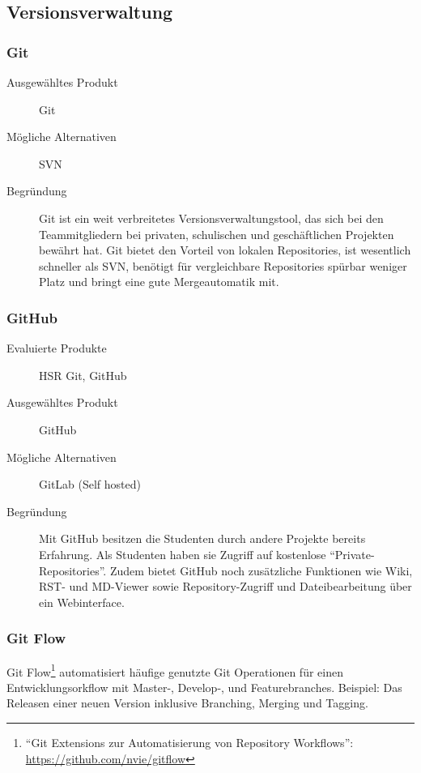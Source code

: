 		\subsection*{Versionsverwaltung}
			\subsubsection*{Git}
				\begin{description}
					\item[Ausgewähltes Produkt] Git
					\item[Mögliche Alternativen] SVN
					\item[Begründung] Git ist ein weit verbreitetes Versionsverwaltungstool, das sich bei den Teammitgliedern bei privaten, schulischen und geschäftlichen Projekten bewährt hat. Git bietet den Vorteil von lokalen Repositories, ist wesentlich schneller als SVN, benötigt für vergleichbare Repositories spürbar weniger Platz und bringt eine gute Mergeautomatik mit.
				\end{description}

			\subsubsection*{GitHub}
				\begin{description}
					\item[Evaluierte Produkte] HSR Git, GitHub
					\item[Ausgewähltes Produkt] GitHub
					\item[Mögliche Alternativen] GitLab (Self hosted)
					\item[Begründung] Mit GitHub besitzen die Studenten durch andere Projekte bereits Erfahrung. 
						Als Studenten haben sie Zugriff auf kostenlose "`Private-Repositories"'. 
						Zudem bietet GitHub noch zusätzliche Funktionen wie Wiki, RST- und MD-Viewer sowie
						Repository-Zugriff und Dateibearbeitung über ein Webinterface.
				\end{description}
				
			\subsubsection*{Git Flow}
				Git Flow\footnote{"`Git Extensions zur Automatisierung von Repository Workflows"': \url{https://github.com/nvie/gitflow}} automatisiert häufige genutzte Git Operationen für einen Entwicklungsorkflow \cite{driessen_successful_2010} mit Master-, Develop-, und Featurebranches.
				Beispiel: Das Releasen einer neuen Version inklusive Branching, Merging und Tagging.
				
